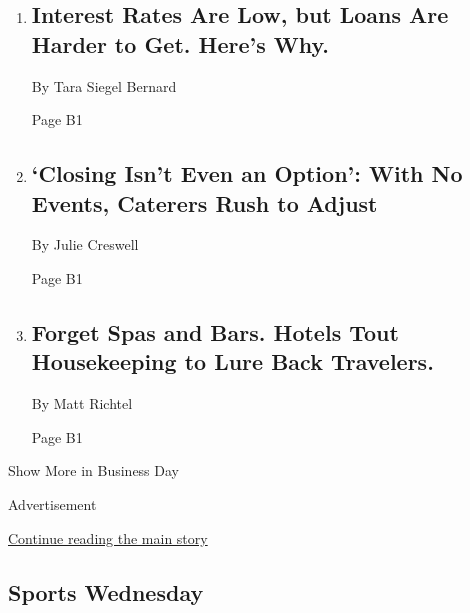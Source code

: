 \begin{enumerate}
\def\labelenumi{\arabic{enumi}.}
\item
  \href{/2020/08/04/your-money/mortgage-loans-credit-cards-coronavirus.html}{}

  \hypertarget{interest-rates-are-low-but-loans-are-harder-to-get-heres-why}{%
  \subsection{Interest Rates Are Low, but Loans Are Harder to Get.
  Here's
  Why.}\label{interest-rates-are-low-but-loans-are-harder-to-get-heres-why}}

  By Tara Siegel Bernard

  Page B1
\item
  \href{/2020/08/04/business/coronavirus-struggling-caterers.html}{}

  \hypertarget{closing-isnt-even-an-option-with-no-events-caterers-rush-to-adjust-1}{%
  \subsection{`Closing Isn't Even an Option': With No Events, Caterers
  Rush to
  Adjust}\label{closing-isnt-even-an-option-with-no-events-caterers-rush-to-adjust-1}}

  By Julie Creswell

  Page B1
\item
  \href{/2020/08/04/health/coronavirus-hotels-infect.html}{}

  \hypertarget{forget-spas-and-bars-hotels-tout-housekeeping-to-lure-back-travelers-1}{%
  \subsection{Forget Spas and Bars. Hotels Tout Housekeeping to Lure
  Back
  Travelers.}\label{forget-spas-and-bars-hotels-tout-housekeeping-to-lure-back-travelers-1}}

  By Matt Richtel

  Page B1
\end{enumerate}

Show More in Business Day

Advertisement

\protect\hyperlink{after-mid4}{Continue reading the main story}

\hypertarget{sports-wednesday}{%
\subsection{Sports Wednesday}\label{sports-wednesday}}

